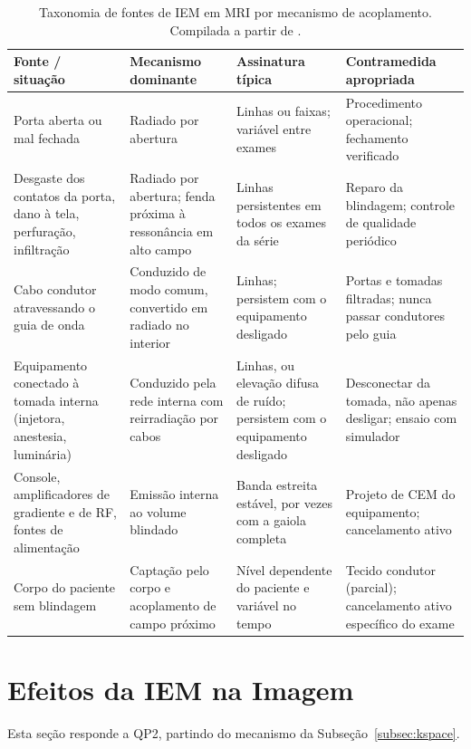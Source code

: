 \documentclass[portuguese]{sbcreviews-2025}%
\begin{document}
\begin{table}[t]
\centering\small
\caption{Taxonomia de fontes de IEM em MRI por mecanismo de acoplamento. Compilada a partir de \citet{kwok2024rf, zhao2024emi, oreilly2021invivo}.}
\label{tab:fontes}
\begin{tabular}{|p{3.1cm}|p{3.3cm}|p{3.3cm}|p{3.9cm}|}
\hline
\textbf{Fonte / situação} & \textbf{Mecanismo dominante} & \textbf{Assinatura típica} & \textbf{Contramedida apropriada} \\ \hline
Porta aberta ou mal fechada & Radiado por abertura & Linhas ou faixas; variável entre exames & Procedimento operacional; fechamento verificado \\ \hline
Desgaste dos contatos da porta, dano à tela, perfuração, infiltração & Radiado por abertura; fenda próxima à ressonância em alto campo & Linhas persistentes em todos os exames da série & Reparo da blindagem; controle de qualidade periódico \\ \hline
Cabo condutor atravessando o guia de onda & Conduzido de modo comum, convertido em radiado no interior & Linhas; persistem com o equipamento desligado & Portas e tomadas filtradas; nunca passar condutores pelo guia \\ \hline
Equipamento conectado à tomada interna (injetora, anestesia, luminária) & Conduzido pela rede interna com reirradiação por cabos & Linhas, ou elevação difusa de ruído; persistem com o equipamento desligado & Desconectar da tomada, não apenas desligar; ensaio com simulador \\ \hline
Console, amplificadores de gradiente e de RF, fontes de alimentação & Emissão interna ao volume blindado & Banda estreita estável, por vezes com a gaiola completa & Projeto de CEM do equipamento; cancelamento ativo \\ \hline
Corpo do paciente sem blindagem & Captação pelo corpo e acoplamento de campo próximo & Nível dependente do paciente e variável no tempo & Tecido condutor (parcial); cancelamento ativo específico do exame \\ \hline
\end{tabular}
\end{table}


\section{Efeitos da IEM na Imagem}
\label{sec:efeitos}

Esta seção responde a QP2, partindo do mecanismo da Subseção~\ref{subsec:kspace}.
\end{document}
